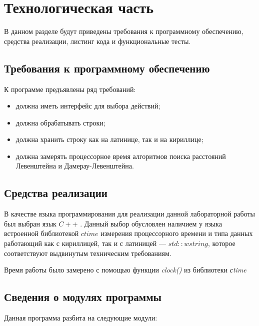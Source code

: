 \chapter{Технологическая часть}

В данном разделе будут приведены требования к программному обеспечению, средства реализации, листинг кода и функциональные тесты.

\section{Требования к программному обеспечению}

К программе предъявлены ряд требований:

\begin{itemize}
	\item должна иметь интерфейс для выбора действий;
	\item должна обрабатывать строки;
	\item должна хранить строку как на латинице, так и на кириллице;
	\item должна замерять процессорное время алгоритмов поиска расстояний Левенштейна и Дамерау-Левенштейна.
\end{itemize}

\section{Средства реализации}

В качестве языка программирования для реализации данной лабораторной работы был выбран язык $C++$ \cite{cpp-lang}. Данный выбор обусловлен наличием у языка
встроенной библиотекой $ctime$ измерения процессорного времени и типа данных работающий как с кириллицей, так и с латиницей --- $std::wstring$, которое соответствуют выдвинутым техническим требованиям.

Время работы было замерено с помощью функции \textit{clock()} из библиотеки \textit{сtime}\cite{cpp-lang-time}
 
\clearpage
 
\section{Сведения о модулях программы}

Данная программа разбита на следующие модули:

